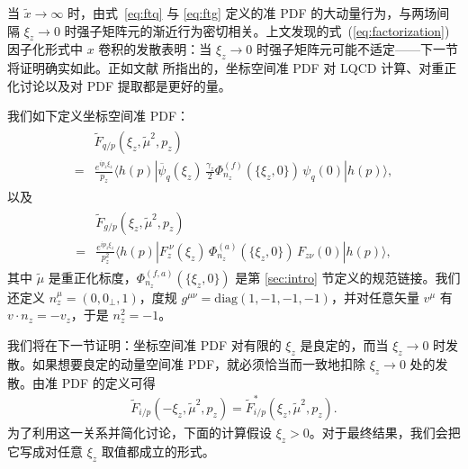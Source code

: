 当 $\tilde{x}\to\infty$ 时，由式~\eqref{eq:ftq} 与 \eqref{eq:ftg} 定义的准 PDF 的大动量行为，与两场间隔 $\xi_z\to 0$ 时强子矩阵元的渐近行为密切相关。上文发现的式~(\ref{eq:factorization}) 因子化形式中 $x$ 卷积的发散表明：当 $\xi_z\to 0$ 时强子矩阵元可能不适定——下一节将证明确实如此。正如文献 \cite{Ma:2014jla} 所指出的，坐标空间准 PDF 对 LQCD 计算、对重正化讨论以及对 PDF 提取都是更好的量。

我们如下定义坐标空间准 PDF：
\begin{align}\label{eq:ftqx}
\begin{split}
&\tilde{F}_{q/p}(\xi_z,\tilde{\mu}^2,p_z)\\
=& \frac{e^{i p_z \xi_z}}{p_z} \langle h(p)| \overline{\psi}_q(\xi_z)\,\frac{\gamma_z}{2}
\Phi_{n_z}^{(f)}(\{\xi_z,0\})\, \psi_q(0) | h(p) \rangle,
\end{split}
\end{align}
以及
\begin{align}\label{eq:ftgx}
\begin{split}
&\tilde{F}_{g/p}(\xi_z,\tilde{\mu}^2,p_z)\\
=&\frac{e^{i p_z \xi_z}}{p_z^2}\langle h(p)| F_{z}^{\ \nu}(\xi_z)\,
\Phi_{n_z}^{(a)}(\{\xi_z,0\})\, F_{z\nu}(0) | h(p) \rangle,
\end{split}
\end{align}
其中 $\tilde{\mu}$ 是重正化标度，$\Phi_{n_z}^{(f,a)}(\{\xi_z,0\})$ 是第 \ref{sec:intro} 节定义的规范链接。我们还定义 $n_z^\mu = (0,0_\perp, 1)$，度规 $g^{\mu\nu}=\text{diag}(1,-1,-1,-1)$，并对任意矢量 $v^\mu$ 有 $v\cdot n_z =- v_z$，于是 $n_z^2 = -1$。


我们将在下一节证明：坐标空间准 PDF 对有限的 $\xi_z$ 是良定的，而当 $\xi_z\to0$ 时发散。如果想要良定的动量空间准 PDF，就必须恰当而一致地扣除 $\xi_z\to0$ 处的发散。由准 PDF 的定义可得
\begin{align}
\tilde{F}_{i/p}(-\xi_z,\tilde{\mu}^2,p_z)=\tilde{F}_{i/p}^*(\xi_z,\tilde{\mu}^2,p_z).
\end{align}
为了利用这一关系并简化讨论，下面的计算假设 $\xi_z>0$。对于最终结果，我们会把它写成对任意 $\xi_z$ 取值都成立的形式。

